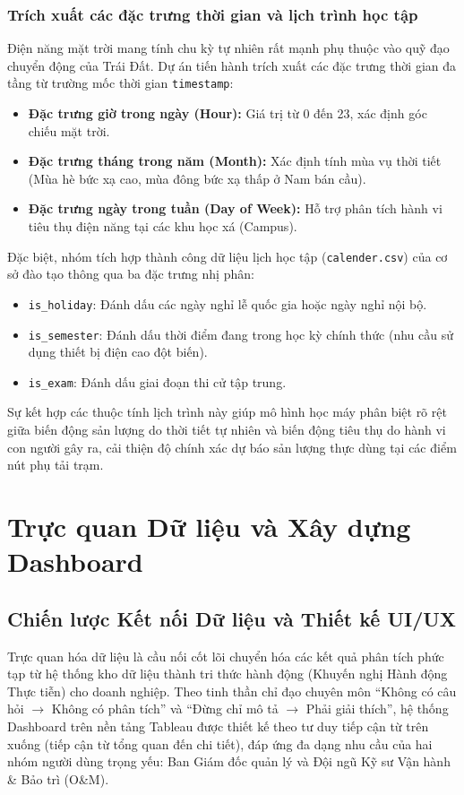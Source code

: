 \documentclass[12pt, a4paper]{report}
\begin{document}
\subsection{Trích xuất các đặc trưng thời gian và lịch trình học tập}
Điện năng mặt trời mang tính chu kỳ tự nhiên rất mạnh phụ thuộc vào quỹ đạo chuyển động của Trái Đất. Dự án tiến hành trích xuất các đặc trưng thời gian đa tầng từ trường mốc thời gian \texttt{timestamp}:
\begin{itemize}
    \item \textbf{Đặc trưng giờ trong ngày (Hour):} Giá trị từ 0 đến 23, xác định góc chiếu mặt trời.
    \item \textbf{Đặc trưng tháng trong năm (Month):} Xác định tính mùa vụ thời tiết (Mùa hè bức xạ cao, mùa đông bức xạ thấp ở Nam bán cầu).
    \item \textbf{Đặc trưng ngày trong tuần (Day of Week):} Hỗ trợ phân tích hành vi tiêu thụ điện năng tại các khu học xá (Campus).
\end{itemize}

Đặc biệt, nhóm tích hợp thành công dữ liệu lịch học tập (\texttt{calender.csv}) của cơ sở đào tạo thông qua ba đặc trưng nhị phân:
\begin{itemize}
    \item \texttt{is\_holiday}: Đánh dấu các ngày nghỉ lễ quốc gia hoặc ngày nghỉ nội bộ.
    \item \texttt{is\_semester}: Đánh dấu thời điểm đang trong học kỳ chính thức (nhu cầu sử dụng thiết bị điện cao đột biến).
    \item \texttt{is\_exam}: Đánh dấu giai đoạn thi cử tập trung.
\end{itemize}
Sự kết hợp các thuộc tính lịch trình này giúp mô hình học máy phân biệt rõ rệt giữa biến động sản lượng do thời tiết tự nhiên và biến động tiêu thụ do hành vi con người gây ra, cải thiện độ chính xác dự báo sản lượng thực dùng tại các điểm nút phụ tải trạm.

\newpage
\chapter{Trực quan Dữ liệu và Xây dựng Dashboard}
\label{chap:dashboard}

\section{Chiến lược Kết nối Dữ liệu và Thiết kế UI/UX}
\label{sec:dashboard_strategy}

Trực quan hóa dữ liệu là cầu nối cốt lõi chuyển hóa các kết quả phân tích phức tạp từ hệ thống kho dữ liệu thành tri thức hành động (Khuyến nghị Hành động Thực tiễn) cho doanh nghiệp. Theo tinh thần chỉ đạo chuyên môn ``Không có câu hỏi $\rightarrow$ Không có phân tích'' và ``Đừng chỉ mô tả $\rightarrow$ Phải giải thích'', hệ thống Dashboard trên nền tảng Tableau được thiết kế theo tư duy tiếp cận từ trên xuống (tiếp cận từ tổng quan đến chi tiết), đáp ứng đa dạng nhu cầu của hai nhóm người dùng trọng yếu: Ban Giám đốc quản lý và Đội ngũ Kỹ sư Vận hành \& Bảo trì (O\&M).
\end{document}
